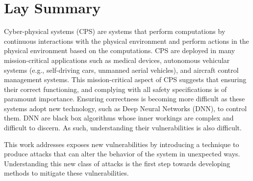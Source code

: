 

\chapter{Lay Summary}

Cyber-physical systems (CPS) are systems that perform computations by continuous interactions with the physical environment and perform actions in the physical environment based on the computations. 
\ac{CPS} are deployed in many mission-critical applications such as medical devices, autonomous vehicular systems (e.g., self-driving cars, unmanned aerial vehicles), and aircraft control management systems. 
This mission-critical aspect of \ac{CPS} suggests that ensuring their correct functioning, and complying with all safety specifications is of paramount importance. 
Ensuring correctness is becoming more difficult as these systems adopt new technology, such as Deep Neural Networks (DNN), to control them. 
\ac{DNN} are black box algorithms whose inner workings are complex and difficult to discern.
As such, understanding their vulnerabilities is also difficult. 

This work addresses exposes new vulnerabilities by introducing a  technique to produce attacks that can alter the behavior of the system in unexpected ways. 
Understanding this new class of attacks is the first step towards developing methods to mitigate these vulnerabilities. 



 



